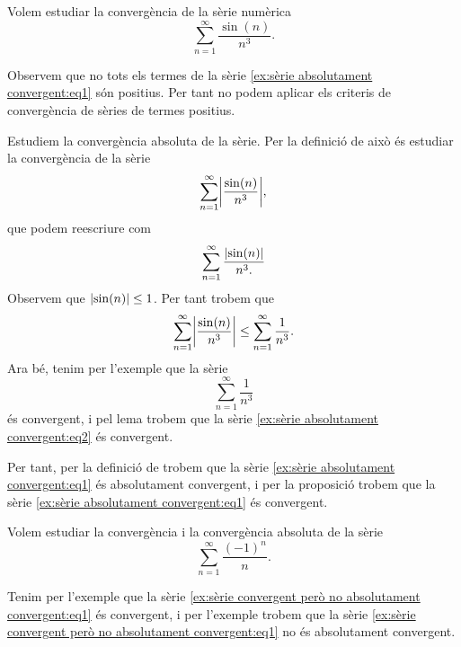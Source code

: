 \documentclass[../Apunts.tex]{subfiles}
\begin{document}
	\begin{example}
		\label{ex:sèrie absolutament convergent}
		Volem estudiar la convergència de la sèrie numèrica
		\begin{equation}
			\label{ex:sèrie absolutament convergent:eq1}
			\sum_{n=1}^{\infty}\frac{\sin(n)}{n^{3}}.
		\end{equation}
		\begin{solution}
			Observem que no tots els termes de la sèrie \eqref{ex:sèrie absolutament convergent:eq1} són positius. Per tant no podem aplicar els criteris de convergència de sèries de termes positius.
			
			Estudiem la convergència absoluta de la sèrie. Per la definició de  això és estudiar la convergència de la sèrie
			\begin{equation}
				\label{ex:sèrie absolutament convergent:eq2}
				\sum_{n=1}^{\infty}\abs{\frac{\sin(n)}{n^{3}}},
			\end{equation}
			que podem reescriure com
			\[\sum_{n=1}^{\infty}\frac{\abs{\sin(n)}}{n^{3}.}\]
			Observem que \(\abs{\sin(n)}\leq1\). Per tant trobem que
			\[\sum_{n=1}^{\infty}\abs{\frac{\sin(n)}{n^{3}}}\leq\sum_{n=1}^{\infty}\frac{1}{n^{3}}.\]
			Ara bé, tenim per l'exemple  que la sèrie
			\[\sum_{n=1}^{\infty}\frac{1}{n^{3}}\]
			és convergent, i pel lema  trobem que la sèrie \eqref{ex:sèrie absolutament convergent:eq2} és convergent.
			
			Per tant, per la definició de  trobem que la sèrie \eqref{ex:sèrie absolutament convergent:eq1} és absolutament convergent, i per la proposició  trobem que la sèrie \eqref{ex:sèrie absolutament convergent:eq1} és convergent.
		\end{solution}
	\end{example}
	\begin{example} %
		\label{ex:sèrie convergent però no absolutament convergent}
		Volem estudiar la convergència i la convergència absoluta de la sèrie
		\begin{equation}
			\label{ex:sèrie convergent però no absolutament convergent:eq1}
			\sum_{n=1}^{\infty}\frac{(-1)^{n}}{n}.
		\end{equation}
		\begin{solution}
			Tenim per l'exemple  que la sèrie \eqref{ex:sèrie convergent però no absolutament convergent:eq1} és convergent, i per l'exemple  trobem que la sèrie \eqref{ex:sèrie convergent però no absolutament convergent:eq1} no és absolutament convergent.
		\end{solution}
	\end{example}
\end{document}
